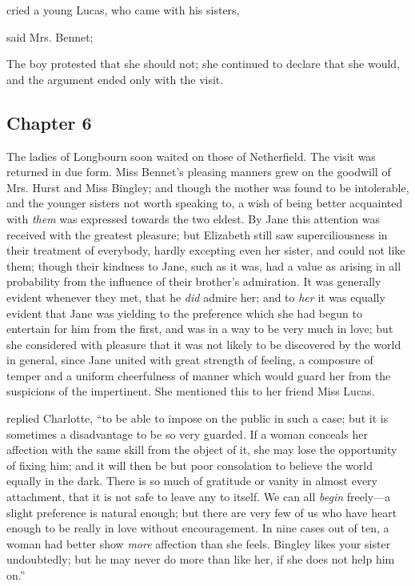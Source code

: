  cried a young Lucas, who came with his sisters, 

 said Mrs. Bennet; 

The boy protested that she should not; she continued to declare that she would, and the argument ended only with the visit.

\subsection[chapter-6]{\useURL[url6][][][]\from[url6] Chapter 6}

The ladies of Longbourn soon waited on those of Netherfield. The visit was returned in due form. Miss Bennet's pleasing manners grew on the goodwill of Mrs. Hurst and Miss Bingley; and though the mother was found to be intolerable, and the younger sisters not worth speaking to, a wish of being better acquainted with {\em them} was expressed towards the two eldest. By Jane this attention was received with the greatest pleasure; but Elizabeth still saw superciliousness in their treatment of everybody, hardly excepting even her sister, and could not like them; though their kindness to Jane, such as it was, had a value as arising in all probability from the influence of their brother's admiration. It was generally evident whenever they met, that he {\em did} admire her; and to {\em her} it was equally evident that Jane was yielding to the preference which she had begun to entertain for him from the first, and was in a way to be very much in love; but she considered with pleasure that it was not likely to be discovered by the world in general, since Jane united with great strength of feeling, a composure of temper and a uniform cheerfulness of manner which would guard her from the suspicions of the impertinent. She mentioned this to her friend Miss Lucas.

 replied Charlotte, “to be able to impose on the public in such a case; but it is sometimes a disadvantage to be so very guarded. If a woman conceals her affection with the same skill from the object of it, she may lose the opportunity of fixing him; and it will then be but poor consolation to believe the world equally in the dark. There is so much of gratitude or vanity in almost every attachment, that it is not safe to leave any to itself. We can all {\em begin} freely---a slight preference is natural enough; but there are very few of us who have heart enough to be really in love without encouragement. In nine cases out of ten, a woman had better show {\em more} affection than she feels. Bingley likes your sister undoubtedly; but he may never do more than like her, if she does not help him on.”

